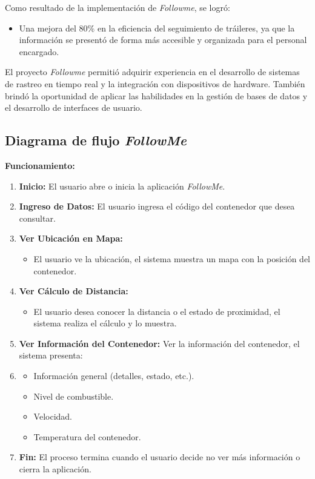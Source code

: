 \documentclass[protocolo.tex]{subfiles}
\begin{document}
Como resultado de la implementación de \textit{Followme}, se logró:

\begin{itemize}
\item Una mejora del 80\% en la eficiencia del seguimiento de tráileres, ya que la información se  presentó  de forma más accesible y organizada para el personal encargado.
\end{itemize}

El proyecto \textit{Followme} permitió adquirir experiencia en el desarrollo de sistemas de rastreo en tiempo real y la integración con dispositivos de hardware. También brindó la oportunidad de aplicar las habilidades en la gestión de bases de datos y el desarrollo de interfaces de usuario.

\subsection{Diagrama de flujo \textit{FollowMe}} 
\textbf{Funcionamiento:}
\begin{enumerate}
    \item \textbf{Inicio:}  
    El usuario abre o inicia la aplicación \textit{FollowMe}.
    \item \textbf{Ingreso de Datos:}  
    El usuario ingresa el código del contenedor que desea consultar.
    \item \textbf{Ver Ubicación en Mapa:}  
    \begin{itemize}
        \item El usuario ve la ubicación, el sistema muestra un mapa con la posición del contenedor.
       
    \end{itemize}
    \item \textbf{Ver Cálculo de Distancia:} 
    \begin{itemize}
        \item El usuario desea conocer la distancia o el estado de proximidad, el sistema realiza el cálculo y lo muestra.
        
    \end{itemize}
    \item \textbf{Ver Información del Contenedor:} 
    Ver la información del contenedor, el sistema presenta:
    \item \begin{itemize}
        \item Información general (detalles, estado, etc.).
        \item Nivel de combustible.
        \item Velocidad.
        \item Temperatura del contenedor.
    \end{itemize}
    \item \textbf{Fin:} 
    El proceso termina cuando el usuario decide no ver más información o cierra la aplicación.
\end{enumerate}
\end{document}
